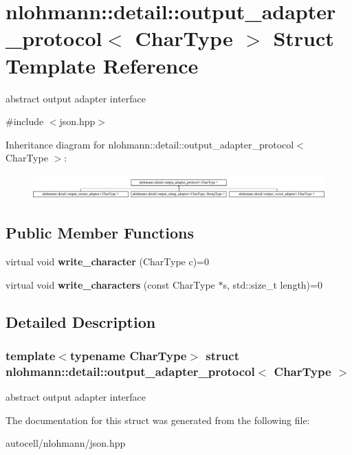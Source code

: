 \hypertarget{structnlohmann_1_1detail_1_1output__adapter__protocol}{}\section{nlohmann\+:\+:detail\+:\+:output\+\_\+adapter\+\_\+protocol$<$ Char\+Type $>$ Struct Template Reference}
\label{structnlohmann_1_1detail_1_1output__adapter__protocol}


abstract output adapter interface  




{\ttfamily \#include $<$json.\+hpp$>$}

Inheritance diagram for nlohmann\+:\+:detail\+:\+:output\+\_\+adapter\+\_\+protocol$<$ Char\+Type $>$\+:\begin{figure}[H]
\begin{center}
\leavevmode
\includegraphics[height=0.962199cm]{structnlohmann_1_1detail_1_1output__adapter__protocol}
\end{center}
\end{figure}
\subsection*{Public Member Functions}
\begin{DoxyCompactItemize}
\item 
\mbox{\label{structnlohmann_1_1detail_1_1output__adapter__protocol_a3381896fe1be557f591de2e917cdc7d5}} 
virtual void {\bfseries write\+\_\+character} (Char\+Type c)=0
\item 
\mbox{\label{structnlohmann_1_1detail_1_1output__adapter__protocol_a2f410a164e0eda17cf6561114b0eee4a}} 
virtual void {\bfseries write\+\_\+characters} (const Char\+Type $\ast$s, std\+::size\+\_\+t length)=0
\end{DoxyCompactItemize}


\subsection{Detailed Description}
\subsubsection*{template$<$typename Char\+Type$>$\newline
struct nlohmann\+::detail\+::output\+\_\+adapter\+\_\+protocol$<$ Char\+Type $>$}

abstract output adapter interface 

The documentation for this struct was generated from the following file\+:\begin{DoxyCompactItemize}
\item 
autocell/nlohmann/json.\+hpp\end{DoxyCompactItemize}
